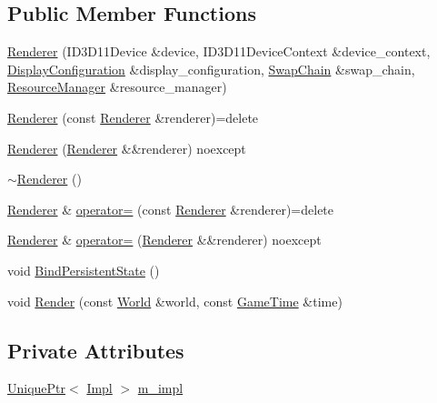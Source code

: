 \subsection*{Public Member Functions}
\begin{DoxyCompactItemize}
\item 
\mbox{\hyperlink{classmage_1_1rendering_1_1_renderer_a8e517a323bb67bf8b347ff46204ccec9}{Renderer}} (I\+D3\+D11\+Device \&device, I\+D3\+D11\+Device\+Context \&device\+\_\+context, \mbox{\hyperlink{classmage_1_1rendering_1_1_display_configuration}{Display\+Configuration}} \&display\+\_\+configuration, \mbox{\hyperlink{classmage_1_1rendering_1_1_swap_chain}{Swap\+Chain}} \&swap\+\_\+chain, \mbox{\hyperlink{classmage_1_1rendering_1_1_resource_manager}{Resource\+Manager}} \&resource\+\_\+manager)
\item 
\mbox{\hyperlink{classmage_1_1rendering_1_1_renderer_adf10b0a249959f9a9fff5714c537bbd8}{Renderer}} (const \mbox{\hyperlink{classmage_1_1rendering_1_1_renderer}{Renderer}} \&renderer)=delete
\item 
\mbox{\hyperlink{classmage_1_1rendering_1_1_renderer_aab7768b815e740173a20e10795a6f93e}{Renderer}} (\mbox{\hyperlink{classmage_1_1rendering_1_1_renderer}{Renderer}} \&\&renderer) noexcept
\item 
\mbox{\hyperlink{classmage_1_1rendering_1_1_renderer_ab5c0553ac8a095f55eab371b843b354b}{$\sim$\+Renderer}} ()
\item 
\mbox{\hyperlink{classmage_1_1rendering_1_1_renderer}{Renderer}} \& \mbox{\hyperlink{classmage_1_1rendering_1_1_renderer_a23338d210ca0008a05cf060f35d4dc70}{operator=}} (const \mbox{\hyperlink{classmage_1_1rendering_1_1_renderer}{Renderer}} \&renderer)=delete
\item 
\mbox{\hyperlink{classmage_1_1rendering_1_1_renderer}{Renderer}} \& \mbox{\hyperlink{classmage_1_1rendering_1_1_renderer_a8f0f0323dc57cf2e1f76491bf6eaa97a}{operator=}} (\mbox{\hyperlink{classmage_1_1rendering_1_1_renderer}{Renderer}} \&\&renderer) noexcept
\item 
void \mbox{\hyperlink{classmage_1_1rendering_1_1_renderer_a7fa8fd234b69dabc51d7a214afb641b3}{Bind\+Persistent\+State}} ()
\item 
void \mbox{\hyperlink{classmage_1_1rendering_1_1_renderer_abbab1dd0a3a4eb06cb6fd4f0a75eb192}{Render}} (const \mbox{\hyperlink{classmage_1_1rendering_1_1_world}{World}} \&world, const \mbox{\hyperlink{classmage_1_1_game_time}{Game\+Time}} \&time)
\end{DoxyCompactItemize}
\subsection*{Private Attributes}
\begin{DoxyCompactItemize}
\item 
\mbox{\hyperlink{namespacemage_a3316d7143a973e37adf1110f2e80ca31}{Unique\+Ptr}}$<$ \mbox{\hyperlink{classmage_1_1rendering_1_1_renderer_1_1_impl}{Impl}} $>$ \mbox{\hyperlink{classmage_1_1rendering_1_1_renderer_aee44d4c9014216d84030ecfc6e64b1e4}{m\+\_\+impl}}
\end{DoxyCompactItemize}


